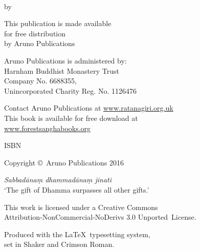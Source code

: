 
\cleartoverso
\thispagestyle{empty}

{\copyrightsize
\centering
\setlength{\parindent}{0pt}%
\setlength{\parskip}{0.8\baselineskip}%

\thetitle\\
by \theauthor

This publication is made available\\
for free distribution\\
by Aruno Publications

Aruno Publications is administered by:\\
Harnham Buddhist Monastery Trust\\
Company No. 6688355,\\
Unincorporated Charity Reg. No. 1126476

Contact Aruno Publications at \href{http://ratanagiri.org.uk/}{www.ratanagiri.org.uk}\\
This book is available for free download at\\
\href{http://forestsanghabooks.org/}{www.forestsanghabooks.org}

ISBN \theISBN

\theEditionInfo

Copyright \copyright\ Aruno Publications 2016

\vfill

\textit{Sabbadānaṃ dhammadānaṃ jinati}\\
‘The gift of Dhamma surpasses all other gifts.’

This work is licensed under a Creative Commons\\
Attribution-NonCommercial-NoDerivs 3.0 Unported~License.

Produced with the \LaTeX\ typesetting system,\\
set in Shaker and Crimson Roman.

}
